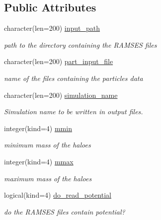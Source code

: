 \subsection*{Public Attributes}
\begin{DoxyCompactItemize}
\item 
character(len=200) \hyperlink{structmodconstant_1_1type__parameter__pfof_a4ec6b9cf9beb861220a74b20d513dc99}{input\+\_\+path}
\begin{DoxyCompactList}\small\item\em path to the directory containing the R\+A\+M\+S\+ES files \end{DoxyCompactList}\item 
character(len=200) \hyperlink{structmodconstant_1_1type__parameter__pfof_ac6d921f4e7cea83883c15e106de98adf}{part\+\_\+input\+\_\+file}
\begin{DoxyCompactList}\small\item\em name of the files containing the particles data \end{DoxyCompactList}\item 
character(len=200) \hyperlink{structmodconstant_1_1type__parameter__pfof_a47ac45f599246d74572f1e8ca85803c0}{simulation\+\_\+name}
\begin{DoxyCompactList}\small\item\em Simulation name to be written in output files. \end{DoxyCompactList}\item 
integer(kind=4) \hyperlink{structmodconstant_1_1type__parameter__pfof_ac284b2b966517e18568a1410337b8bc5}{mmin}
\begin{DoxyCompactList}\small\item\em minimum mass of the haloes \end{DoxyCompactList}\item 
integer(kind=4) \hyperlink{structmodconstant_1_1type__parameter__pfof_a1140f2035cbceedd46862b69e347edf2}{mmax}
\begin{DoxyCompactList}\small\item\em maximum mass of the haloes \end{DoxyCompactList}\item 
logical(kind=4) \hyperlink{structmodconstant_1_1type__parameter__pfof_aba812b01af16a40aa26a33136619786a}{do\+\_\+read\+\_\+potential}
\begin{DoxyCompactList}\small\item\em do the R\+A\+M\+S\+ES files contain potential? \end{DoxyCompactList}\item 

\end{DoxyCompactItemize}
